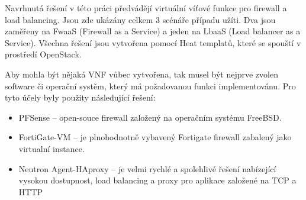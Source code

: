 Navrhnutá řešení v této práci předvádějí virtuální víťové funkce pro firewall a load balancing. Jsou zde ukázány celkem 3 scénáře případu užíti. Dva jsou zaměřeny na FwaaS (Firewall as a Service) a jeden na LbaaS (Load balancer as a Service). Všechna řešení jsou vytvořena pomocí Heat templatů, které se spouští v prostředí OpenStack.

Aby mohla být nějaká VNF vůbec vytvořena, tak musel být nejprve zvolen software či operační systěm, který má požadovanou funkci implementovánu. Pro tyto účely byly použity následující řešení:

\begin{itemize}
\item PFSense – open-souce firewall založený na operačním systému FreeBSD.
\item FortiGate-VM – je plnohodnotně vybavený Fortigate firewall zabalený jako virtualní instance.
\item Neutron Agent-HAproxy – je velmi rychlé a spolehlivé řešení nabízející vysokou dostupnost, load balancing a proxy pro aplikace založené na TCP a HTTP
\end{itemize}




